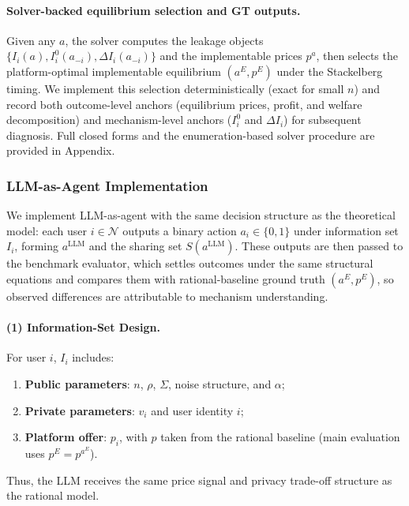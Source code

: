 \documentclass[sigconf,anonymous,review]{acmart}
\theoremstyle{definition}
\begin{document}
\paragraph{Solver-backed equilibrium selection and GT outputs.}
Given any $a$, the solver computes the leakage objects $\{I_i(a),I_i^{0}(a_{-i}),\Delta I_i(a_{-i})\}$ and the implementable prices $p^a$, then selects the platform-optimal implementable equilibrium $(a^E,p^E)$ under the Stackelberg timing. We implement this selection deterministically (exact for small $n$) and record both outcome-level anchors (equilibrium prices, profit, and welfare decomposition) and mechanism-level anchors ($I_i^{0}$ and $\Delta I_i$) for subsequent diagnosis. Full closed forms and the enumeration-based solver procedure are provided in Appendix.



\subsubsection{LLM-as-Agent Implementation}
\label{subsubsec:llm_agent_impl_tmd}
We implement LLM-as-agent with the same decision structure as the theoretical model: each user \(i\in\mathcal{N}\) outputs a binary action \(a_i\in\{0,1\}\) under information set \(I_i\), forming \(a^{\mathrm{LLM}}\) and the sharing set \(S(a^{\mathrm{LLM}})\). These outputs are then passed to the benchmark evaluator, which settles outcomes under the same structural equations and compares them with rational-baseline ground truth \((a^{E},p^{E})\), so observed differences are attributable to mechanism understanding.


\paragraph{(1) Information-Set Design.}
For user \(i\), \(I_i\) includes:
\begin{enumerate}
\item \textbf{Public parameters}: \(n\), \(\rho\), \(\Sigma\), noise structure, and \(\alpha\);
\item \textbf{Private parameters}: \(v_i\) and user identity \(i\);
\item \textbf{Platform offer}: \(p_i\), with \(p\) taken from the rational baseline (main evaluation uses \(p^{E}=p^{a^{E}}\)).
\end{enumerate}
Thus, the LLM receives the same price signal and privacy trade-off structure as the rational model.
\end{document}
